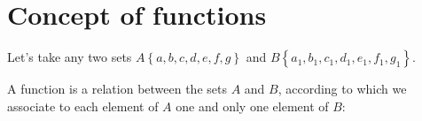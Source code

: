 \documentclass{article}
\begin{document}
\section{Concept of functions}
Let's take any two sets $A\left\{a,b,c,d,e,f,g\right\}$ and $B\left\{a_1,b_1,c_1,d_1,e_1,f_1,g_1\right\}$.


A function is a relation between the sets $A$ and $B$, according to which we
associate to each element of $A$ one and only one element of $B$:
\end{document}
